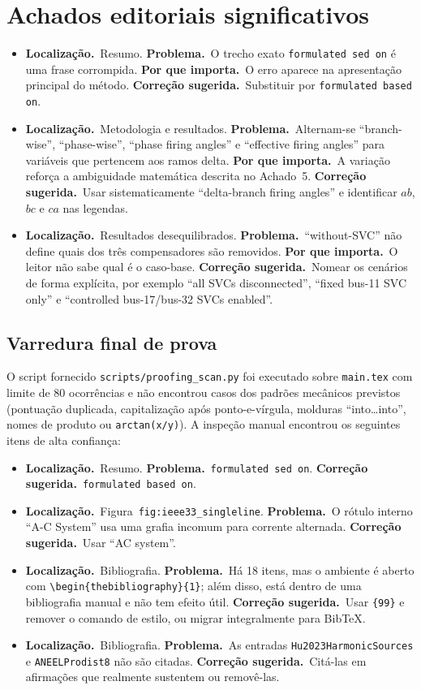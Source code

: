 \documentclass[11pt,a4paper]{article}
\newcommand{\localizacao}{\textbf{Localização.}\ }
\newcommand{\problema}{\textbf{Problema.}\ }
\newcommand{\impacto}{\textbf{Por que importa.}\ }
\newcommand{\correcao}{\textbf{Correção sugerida.}\ }
\begin{document}
\section*{Achados editoriais significativos}

\begin{itemize}
  \item \localizacao Resumo. \problema O trecho exato
  \texttt{formulated sed on} é uma frase corrompida. \impacto O erro aparece
  na apresentação principal do método. \correcao Substituir por
  \texttt{formulated based on}.
  \item \localizacao Metodologia e resultados. \problema Alternam-se
  ``branch-wise'', ``phase-wise'', ``phase firing angles'' e ``effective firing
  angles'' para variáveis que pertencem aos ramos delta. \impacto A variação
  reforça a ambiguidade matemática descrita no Achado~5. \correcao Usar
  sistematicamente ``delta-branch firing angles'' e identificar $ab$, $bc$ e
  $ca$ nas legendas.
  \item \localizacao Resultados desequilibrados. \problema ``without-SVC'' não
  define quais dos três compensadores são removidos. \impacto O leitor não sabe
  qual é o caso-base. \correcao Nomear os cenários de forma explícita, por
  exemplo ``all SVCs disconnected'', ``fixed bus-11 SVC only'' e ``controlled
  bus-17/bus-32 SVCs enabled''.
\end{itemize}

\subsection*{Varredura final de prova}

O script fornecido \texttt{scripts/proofing\_scan.py} foi executado sobre
\texttt{main.tex} com limite de 80 ocorrências e não encontrou casos dos
padrões mecânicos previstos (pontuação duplicada, capitalização após
ponto-e-vírgula, molduras ``into\ldots into'', nomes de produto ou
\texttt{arctan(x/y)}). A inspeção manual encontrou os seguintes itens de alta
confiança:

\begin{itemize}
  \item \localizacao Resumo. \problema \texttt{formulated sed on}.
  \correcao \texttt{formulated based on}.
  \item \localizacao Figura~\texttt{fig:ieee33\_singleline}.
  \problema O rótulo interno ``A-C System'' usa uma grafia incomum para
  corrente alternada. \correcao Usar ``AC system''.
  \item \localizacao Bibliografia. \problema Há 18 itens, mas o ambiente é
  aberto com \verb|\begin{thebibliography}{1}|; além disso,
  \verb|| está dentro de uma bibliografia manual e
  não tem efeito útil. \correcao Usar \verb|{99}| e remover o comando de estilo,
  ou migrar integralmente para BibTeX.
  \item \localizacao Bibliografia. \problema As entradas
  \texttt{Hu2023HarmonicSources} e \texttt{ANEELProdist8} não são citadas.
  \correcao Citá-las em afirmações que realmente sustentem ou removê-las.
\end{itemize}
\end{document}
